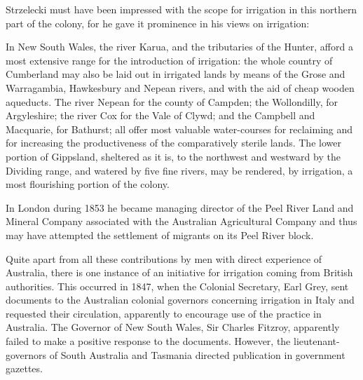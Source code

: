 Strzelecki must have been impressed with the scope for irrigation in
this northern part of the colony, for he gave it prominence in his
views on irrigation:
\begin{Quote}
	In New South Wales, the river Karua,  and
	the tributaries of the Hunter,  afford a
	most extensive range for the introduction of irrigation: the
	whole country of Cumberland may also be laid out in irrigated
	lands by means of the Grose  and
	Warragambia,  Hawkesbury
	 and Nepean 
	rivers, and with the aid of cheap wooden aqueducts.  The river
	Nepean for the county of Campden; the Wollondilly,
	 for Argyleshire; the river Cox
	 for the Vale of Clywd; and the Campbell
	 and Macquarie, 
	for Bathurst; all offer most valuable water-courses for
	reclaiming and for increasing the productiveness of the
	comparatively sterile lands. The lower portion of Gippsland,
	 sheltered as it is, to the northwest
	and westward by the Dividing range, and watered by five fine
	rivers, may be rendered, by irrigation, a most flourishing
	portion of the colony.
\end{Quote}

In London during 1853 he became managing director of the Peel River
Land and Mineral Company associated with the Australian Agricultural
Company and thus may have attempted the settlement of migrants on its
Peel River 
block.

Quite apart from all these contributions by men with direct experience
of Australia, there is one instance of an initiative for irrigation
coming from British authorities.  This occurred in 1847, when the
Colonial Secretary, Earl Grey,  sent documents to
the Australian colonial governors concerning irrigation in Italy and
requested their circulation, apparently to encourage use of the
practice in Australia.  The Governor of New South Wales, Sir Charles
Fitzroy,  apparently failed to make a positive
response to the documents.  However, the lieutenant-governors of South
Australia and Tasmania directed publication in government
gazettes.

